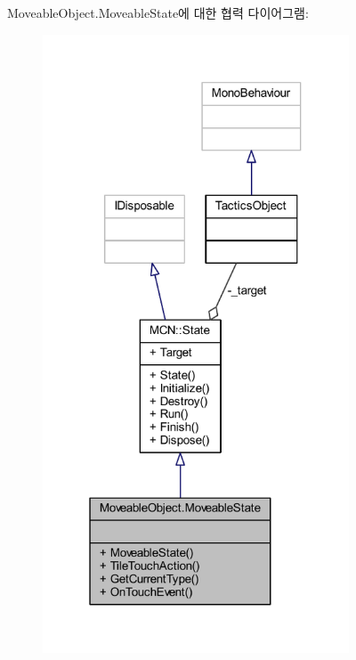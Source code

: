 Moveable\+Object.\+Moveable\+State에 대한 협력 다이어그램\+:\nopagebreak
\begin{figure}[H]
\begin{center}
\leavevmode
\includegraphics[width=258pt]{class_moveable_object_1_1_moveable_state__coll__graph}
\end{center}
\end{figure}

